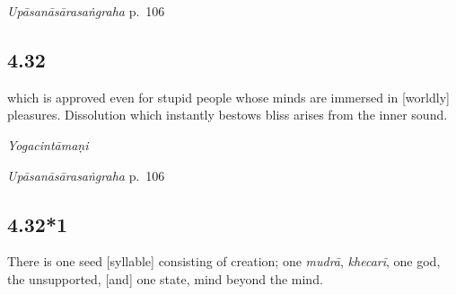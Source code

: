 \begin{ekdosis}
\begin{testimonia}[hp04_031]
\emph{Upāsanāsārasaṅgraha} p.~106
\begin{versinnote}
\end{versinnote}
\end{testimonia}



\subsection*{4.32}
\begin{translation}[hp04_032]
which is approved even for stupid people whose minds are immersed in [worldly] pleasures. Dissolution which instantly bestows bliss arises from the inner sound.
\end{translation}



\begin{testimonia}[hp04_032]
\emph{Yogacintāmaṇi}
\begin{versinnote}
\end{versinnote}

\emph{Upāsanāsārasaṅgraha} p.~106
\begin{versinnote}
\end{versinnote}
\end{testimonia}


\subsection*{4.32*1}
\begin{translation}[hp04_032_1]
There is one seed [syllable] consisting of creation; one \emph{mudrā}, \emph{khecarī}, one god, the unsupported, [and] one state, mind beyond the mind.
\end{translation}


\end{ekdosis}
